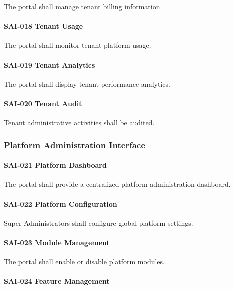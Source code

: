The portal shall manage tenant billing information.

\paragraph{SAI-018 Tenant Usage}

The portal shall monitor tenant platform usage.

\paragraph{SAI-019 Tenant Analytics}

The portal shall display tenant performance analytics.

\paragraph{SAI-020 Tenant Audit}

Tenant administrative activities shall be audited.


\subsubsection*{Platform Administration Interface}

\paragraph{SAI-021 Platform Dashboard}

The portal shall provide a centralized platform administration dashboard.

\paragraph{SAI-022 Platform Configuration}

Super Administrators shall configure global platform settings.

\paragraph{SAI-023 Module Management}

The portal shall enable or disable platform modules.

\paragraph{SAI-024 Feature Management}

